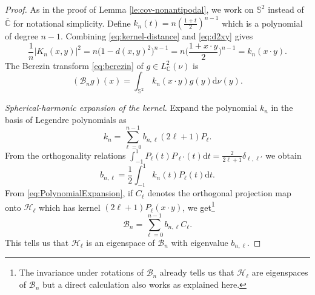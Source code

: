 \documentclass[10pt,reqno]{amsart}
\numberwithin{equation}{section}
\numberwithin{figure}{section}
\theoremstyle{plain}
\newcommand{\<}{\langle}
\renewcommand{\>}{\rangle}
\begin{document}
\begin{proof}
As in the proof of Lemma \ref{le:cov-nonantipodal},
we work on $\mathbb S^2$ instead of $\overline{\mathbb C}$
for notational simplicity.
Define $k_n(t) = n(\frac{1+t}{2})^{n-1}$
which is a polynomial of degree $n-1$.
   Combining
  \eqref{eq:kernel-distance} and \eqref{eq:d2xy} gives
  \begin{equation}
    \frac1n|K_n(x,y)|^2
    =n\bigl(1-d(x,y)^2\bigr)^{n-1}
    =n\Big(\frac{1+x\cdot y}{2}\Big)^{n-1}
    =k_n(x\cdot y).
  \end{equation}
  The Berezin transform \eqref{eq:berezin}
  of $g \in L^2_{\mathbb C}(\nu)$ is
  \begin{equation}
    (\mathcal B_n g) (x)
    =\int_{\mathbb{S}^2} \,k_n(x\cdot y) g(y)\mathrm{d}\nu(y).
  \end{equation}

\noindent
  \emph{Spherical-harmonic expansion of the kernel.} 
  Expand the polynomial $k_n$ in the basis
  of Legendre polynomials as
  \begin{equation}
  \label{eq:PolynomialExpansion}
  k_n = \sum_{\ell=0}^{n-1} b_{n,\ell} (2\ell + 1)
  P_\ell.
  \end{equation}
  From the orthogonality relations
  $\int_{-1}^1 P_\ell(t) P_{\ell'}(t) \mathrm d t
  =\frac{2}{2\ell +1} \delta_{\ell, \ell'}$
  we obtain
  \begin{equation}
  \label{eq:bnlFormula}
  b_{n,\ell} = \frac{1}{2} \int_{-1}^1 
  k_n(t) P_\ell(t) \mathrm d t . 
  \end{equation}
From \eqref{eq:PolynomialExpansion},
if $C_\ell$ denotes the orthogonal projection map
onto $\mathcal H_\ell$ which has kernel
$(2\ell + 1)P_\ell(x\cdot y)$, 
we get\footnote{The invariance under rotations
of $\mathcal B_n$ already
tells us that $\mathcal H_\ell$ are eigenspaces
of $\mathcal B_n$ but a direct calculation
also works as explained here.}
\begin{equation}
\label{eq:BnExpansion}
\mathcal B_n = \sum_{\ell=0}^{n-1} b_{n,\ell} 
C_\ell.
\end{equation}
This tells us that $\mathcal H_\ell$
is an eigenspace of $\mathcal B_n$
with eigenvalue $b_{n,\ell}$.

\vspace{2mm}


\end{proof}
\end{document}
